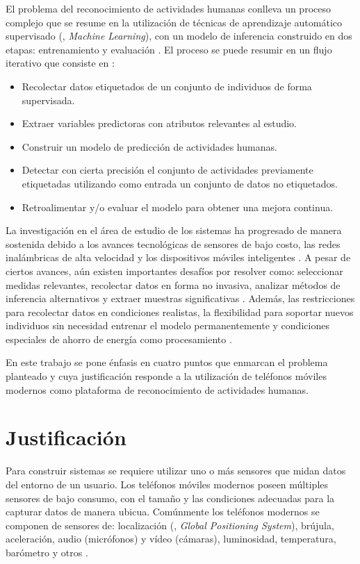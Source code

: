 El problema del reconocimiento de actividades humanas conlleva un
proceso complejo que se resume en la utilización de técnicas de aprendizaje
automático supervisado (, \emph{Machine Learning}), con
un modelo de inferencia construido en dos etapas: entrenamiento y
evaluación \cite{LaraLabrador2013,Kwapisz2011}. El proceso se puede
resumir en un flujo iterativo que consiste en \cite{Bao2004}:
\begin{itemize}
\item Recolectar datos etiquetados de un conjunto de individuos de forma
supervisada. 
\item Extraer variables predictoras con atributos relevantes al estudio.
\item Construir un modelo de predicción de actividades humanas.
\item Detectar con cierta precisión el conjunto de actividades previamente
etiquetadas utilizando como entrada un conjunto de datos no etiquetados.
\item Retroalimentar y/o evaluar el modelo para obtener una mejora continua.
\end{itemize}
La investigación en el área de estudio de los sistemas 
ha progresado de manera sostenida debido a los avances tecnológicas
de sensores de bajo costo, las redes inalámbricas de alta velocidad
y los dispositivos móviles inteligentes \cite{Chen2012}. A pesar
de ciertos avances, aún existen importantes desafíos por resolver
como: seleccionar medidas relevantes, recolectar datos en forma no
invasiva, analizar métodos de inferencia alternativos y extraer muestras
significativas \cite{LaraLabrador2013}. Además, las restricciones
para recolectar datos en condiciones realistas, la flexibilidad para
soportar nuevos individuos sin necesidad entrenar el modelo permanentemente
y condiciones especiales de ahorro de energía como procesamiento \cite{ReyesOrtiz2015}. 

En este trabajo se pone énfasis en cuatro puntos que enmarcan el problema
planteado y cuya justificación responde a la utilización de teléfonos
móviles modernos como plataforma de reconocimiento de actividades
humanas.

\section{Justificación}

\label{sec12:justificaciuxf3n}

Para construir sistemas  se requiere utilizar uno o más
sensores que midan datos del entorno de un usuario. Los teléfonos
móviles modernos poseen múltiples sensores de bajo consumo, con el
tamaño y las condiciones adecuadas para la capturar datos de manera
ubicua. Comúnmente los teléfonos modernos se componen de sensores
de: localización (, \emph{Global Positioning System}),
brújula, aceleración, audio (micrófonos) y vídeo (cámaras), luminosidad,
temperatura, barómetro y otros \cite{Kwapisz2011}.

